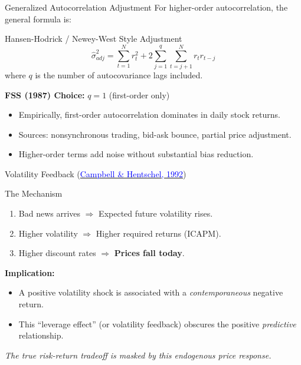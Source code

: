 \documentclass{beamer}
\begin{document}
\begin{frame}{Generalized Autocorrelation Adjustment}
    For higher-order autocorrelation, the general formula is:
    
    \begin{block}{Hansen-Hodrick / Newey-West Style Adjustment}
        \begin{equation}
            \hat{\sigma}^2_{adj} = \sum_{t=1}^{N} r_t^2 + 2\sum_{j=1}^{q} \sum_{t=j+1}^{N} r_t r_{t-j}
        \end{equation}
        where $q$ is the number of autocovariance lags included.
    \end{block}
    
    \textbf{FSS (1987) Choice:} $q = 1$ (first-order only)
    \begin{itemize}
        \item Empirically, first-order autocorrelation dominates in daily stock returns.
        \item Sources: nonsynchronous trading, bid-ask bounce, partial price adjustment.
        \item Higher-order terms add noise without substantial bias reduction.
    \end{itemize}
\end{frame}

\begin{frame}{Volatility Feedback (\href{https://doi.org/10.1016/0304-405X(92)90037-X}{\textcolor{blue}{Campbell \& Hentschel, 1992}})}
    \begin{block}{The Mechanism}
        \begin{enumerate}
            \item Bad news arrives $\Rightarrow$ Expected future volatility rises.
            \item Higher volatility $\Rightarrow$ Higher required returns (ICAPM).
            \item Higher discount rates $\Rightarrow$ \textbf{Prices fall today}.
        \end{enumerate}
    \end{block}
    \textbf{Implication:} 
    \begin{itemize}
        \item A positive volatility shock is associated with a \textit{contemporaneous} negative return.
        \item This ``leverage effect'' (or volatility feedback) obscures the positive \textit{predictive} relationship.
    \end{itemize}
    \vspace{0.3cm}
    \centering
    \textit{The true risk-return tradeoff is masked by this endogenous price response.}
\end{frame}
\end{document}
